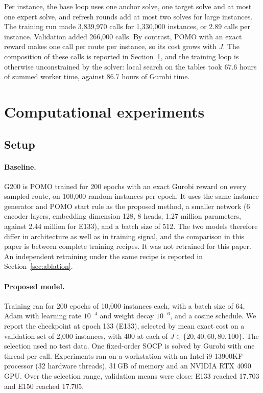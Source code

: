 \documentclass[preprint,12pt,authoryear]{elsarticle}
\begin{document}
Per instance, the base loop uses one anchor solve, one target solve and at most one expert solve, and refresh rounds add at most two solves for large instances. The training run made 3,839,970 calls for 1,330,000 instances, or 2.89 calls per instance. Validation added 266,000 calls. By contrast, POMO with an exact reward makes one call per route per instance, so its cost grows with $J$. The composition of these calls is reported in Section~\ref{sec:experiments}, and the training loop is otherwise unconstrained by the solver: local search on the tables took 67.6 hours of summed worker time, against 86.7 hours of Gurobi time.

\section{Computational experiments}
\label{sec:experiments}

\subsection{Setup}

\paragraph{Baseline.} G200 is POMO trained for 200 epochs with an exact Gurobi reward on every sampled route, on 100,000 random instances per epoch. It uses the same instance generator and POMO start rule as the proposed method, a smaller network (6 encoder layers, embedding dimension 128, 8 heads, 1.27 million parameters, against 2.44 million for E133), and a batch size of 512. The two models therefore differ in architecture as well as in training signal, and the comparison in this paper is between complete training recipes. It was not retrained for this paper. An independent retraining under the same recipe is reported in Section~\ref{sec:ablation}.

\paragraph{Proposed model.} Training ran for 200 epochs of 10,000 instances each, with a batch size of 64, Adam with learning rate $10^{-4}$ and weight decay $10^{-6}$, and a cosine schedule. We report the checkpoint at epoch 133 (E133), selected by mean exact cost on a validation set of 2,000 instances, with 400 at each of $J \in \{20,40,60,80,100\}$. The selection used no test data. One fixed-order SOCP is solved by Gurobi with one thread per call. Experiments ran on a workstation with an Intel i9-13900KF processor (32 hardware threads), 31\,GB of memory and an NVIDIA RTX 4090 GPU. Over the selection range, validation means were close: E133 reached 17.703 and E150 reached 17.705.
\end{document}
